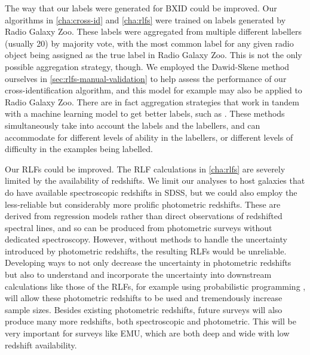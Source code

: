 \documentclass[11pt, a4paper]{book}
\begin{document}
    The way that our labels were generated for BXID could be improved. Our algorithms in \autoref{cha:cross-id} and \autoref{cha:rlfs} were trained on labels generated by Radio Galaxy Zoo. These labels were aggregated from multiple different labellers (usually 20) by majority vote, with the most common label for any given radio object being assigned as the true label in Radio Galaxy Zoo. This is not the only possible aggregation strategy, though. We employed the Dawid-Skene method \citep{dawid79em} ourselves in \autoref{sec:rlfs-manual-validation} to help assess the performance of our cross-identification algorithm, and this model for example may also be applied to Radio Galaxy Zoo. There are in fact aggregation strategies that work in tandem with a machine learning model to get better labels, such as \citet{raykar_learning_2010}. These methods simultaneously take into account the labels and the labellers, and can accommodate for different levels of ability in the labellers, or different levels of difficulty in the examples being labelled.

    Our RLFs could be improved. The RLF calculations in \autoref{cha:rlfs} are severely limited by the availability of redshifts. We limit our analyses to host galaxies that do have available spectroscopic redshifts in SDSS, but we could also employ the less-reliable but considerably more prolific photometric redshifts. These are derived from regression models rather than direct observations of redshifted spectral lines, and so can be produced from photometric surveys without dedicated spectroscopy. However, without methods to handle the uncertainty introduced by photometric redshifts, the resulting RLFs would be unreliable. Developing ways to not only decrease the uncertainty in photometric redshifts but also to understand and incorporate the uncertainty into downstream calculations like those of the RLFs, for example using probabilistic programming \citep[e.g.][]{bingham2018pyro}, will allow these photometric redshifts to be used and tremendously increase sample sizes. Besides existing photometric redshifts, future surveys will also produce many more redshifts, both spectroscopic and photometric. This will be very important for surveys like EMU, which are both deep and wide with low redshift availability.
\end{document}
